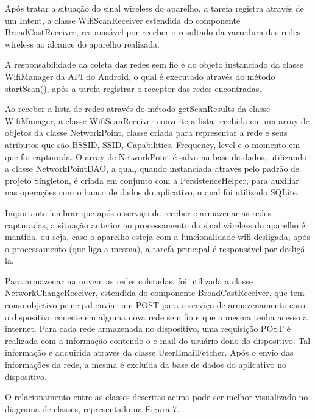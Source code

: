 \documentclass[12pt, %
openright, 
oneside,
a4paper,
brazil]{facom-ufu-abntex2}
\begin{document}
  Após tratar a situação do sinal wireless do aparelho, a tarefa registra através de um Intent, a classe WifiScanReceiver estendida do componente BroadCastReceiver, responsável por receber o resultado da varredura das redes wireless ao alcance do aparelho realizada.
 
 A responsabilidade da coleta das redes sem fio é do objeto instanciado da classe WifiManager da API do Android, o qual é executado através do método startScan(), após a tarefa registrar o receptor das redes encontradas.
 
  Ao receber a lista de redes através do método getScanResults da classe WifiManager, a classe WifiScanReceiver converte a lista recebida em um array de objetos da classe NetworkPoint, classe criada para representar a rede e seus atributos que são BSSID, SSID, Capabilities, Frequency, level e o momento em que foi capturada. O array de NetworkPoint é salvo na base de dados, utilizando a classe NetworkPointDAO, a qual, quando instanciada através pelo padrão de projeto Singleton, é criada em conjunto com a PersistenceHelper, para auxiliar nas operações com o banco de dados do aplicativo, o qual foi utilizado SQLite.
 
 Importante lembrar que após o serviço de receber e armazenar as redes capturadas, a situação anterior ao processamento do sinal wireless do aparelho é mantida, ou seja, caso o aparelho esteja com a funcionalidade wifi desligada, após o processamento (que liga a mesma), a tarefa principal é responsável por desligá-la. 
 
  Para armazenar na nuvem as redes coletadas, foi utilizada a classe NetworkChangeReceiver, estendida do componente BroadCastReceiver, que tem como objetivo principal enviar um POST para o serviço de armazenamento caso o dispositivo conecte em alguma nova rede sem fio e que a mesma tenha acesso a internet. Para cada rede armazenada no dispositivo, uma requisição POST é realizada com a informação contendo o e-mail do usuário dono do dispositivo. Tal informação é adquirida através da classe UserEmailFetcher.  Após o envio das informações da rede, a mesma é excluída da base de dados do aplicativo no dispositivo.

  O relacionamento entre as classes descritas acima pode ser melhor visualizado no diagrama de classes, representado na Figura 7.    
  
\end{document}
